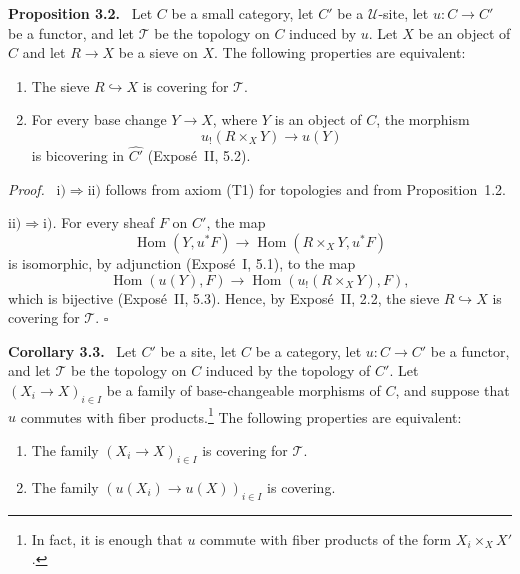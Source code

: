 \documentclass[11pt]{article}
\newcommand{\U}{\mathcal{U}}
\newcommand{\T}{\mathcal{T}}
\newcommand{\Hom}{\operatorname{Hom}}
\newcommand{\qedtext}{\hfill\(\square\)}
\newenvironment{statement}[1]{\par\medskip\noindent\textbf{#1.}\ }{\par\medskip}
\newenvironment{prooftext}{\par\noindent\emph{Proof.}\ }{\par\medskip}
\begin{document}
\begin{statement}{Proposition 3.2}
Let \(C\) be a small category, let \(C'\) be a \(\U\)-site, let \(u:C\to C'\) be a functor, and let \(\T\) be the topology on \(C\) induced by \(u\). Let \(X\) be an object of \(C\) and let \(R\to X\) be a sieve on \(X\). The following properties are equivalent:
\begin{enumerate}[label=\roman*)]
\item The sieve \(R\hookrightarrow X\) is covering for \(\T\).
\item For every base change \(Y\to X\), where \(Y\) is an object of \(C\), the morphism
\[
u_!(R\times_XY)\to u(Y)
\]
is bicov\-ering in \(\widehat{C'}\) (Expos\'e~II, 5.2).
\end{enumerate}
\end{statement}

\begin{prooftext}
\emph{\(\mathrm{i)}\Rightarrow\mathrm{ii)}\)} follows from axiom (T1) for topologies and from Proposition~1.2.

\emph{\(\mathrm{ii)}\Rightarrow\mathrm{i)}\).} For every sheaf \(F\) on \(C'\), the map
\[
\Hom(Y,u^{\ast}F)\to\Hom(R\times_XY,u^{\ast}F)
\]
is isomorphic, by adjunction (Expos\'e~I, 5.1), to the map
\[
\Hom(u(Y),F)\to\Hom(u_!(R\times_XY),F),
\]
which is bijective (Expos\'e~II, 5.3). Hence, by Expos\'e~II, 2.2, the sieve \(R\hookrightarrow X\) is covering for \(\T\). \qedtext
\end{prooftext}

\begin{statement}{Corollary 3.3}
Let \(C'\) be a site, let \(C\) be a category, let \(u:C\to C'\) be a functor, and let \(\T\) be the topology on \(C\) induced by the topology of \(C'\). Let \((X_i\to X)_{i\in I}\) be a family of base-changeable morphisms of \(C\), and suppose that \(u\) commutes with fiber products.\footnote{In fact, it is enough that \(u\) commute with fiber products of the form \(X_i\times_XX'\).} The following properties are equivalent:
\begin{enumerate}[label=\roman*)]
\item The family \((X_i\to X)_{i\in I}\) is covering for \(\T\).
\item The family \((u(X_i)\to u(X))_{i\in I}\) is covering.
\end{enumerate}
\end{statement}
\end{document}
